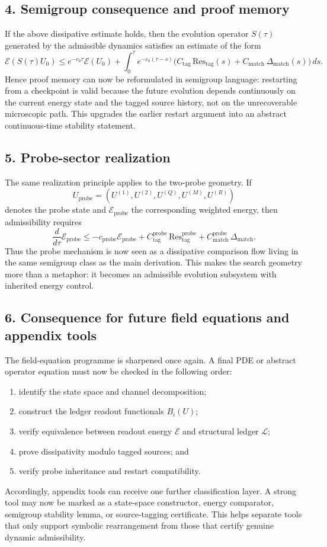 \documentclass[12pt,a4paper]{article}
\begin{document}
\subsection*{4. Semigroup consequence and proof memory}
If the above dissipative estimate holds, then the evolution operator $S(\tau)$
generated by the admissible dynamics satisfies an estimate of the form
\[
\mathcal E(S(\tau)U_0)
\le e^{-c_0\tau}\mathcal E(U_0)
+\int_0^\tau e^{-c_0(\tau-s)}
\bigl(C_{\mathrm{tag}}\,\mathrm{Res}_{\mathrm{tag}}(s)
+ C_{\mathrm{match}}\,\Delta_{\mathrm{match}}(s)\bigr)\,ds.
\]
Hence proof memory can now be reformulated in semigroup language: restarting from a
checkpoint is valid because the future evolution depends continuously on the current
energy state and the tagged source history, not on the unrecoverable microscopic path.
This upgrades the earlier restart argument into an abstract continuous-time stability
statement.

\subsection*{5. Probe-sector realization}
The same realization principle applies to the two-probe geometry. If
\[
U_{\mathrm{probe}}=(U^{(1)},U^{(2)},U^{(Q)},U^{(M)},U^{(R)})
\]
denotes the probe state and $\mathcal E_{\mathrm{probe}}$ the corresponding weighted
energy, then admissibility requires
\[
\frac{d}{d\tau}\mathcal E_{\mathrm{probe}}
\le -c_{\mathrm{probe}}\mathcal E_{\mathrm{probe}}
+ C^{\mathrm{probe}}_{\mathrm{tag}}\,\mathrm{Res}^{\mathrm{probe}}_{\mathrm{tag}}
+ C^{\mathrm{probe}}_{\mathrm{match}}\,\Delta_{\mathrm{match}}.
\]
Thus the probe mechanism is now seen as a dissipative comparison flow living in the
same semigroup class as the main derivation. This makes the search geometry more than
a metaphor: it becomes an admissible evolution subsystem with inherited energy
control.

\subsection*{6. Consequence for future field equations and appendix tools}
The field-equation programme is sharpened once again. A final PDE or abstract
operator equation must now be checked in the following order:
\begin{enumerate}[label=(\arabic*)]
 \item identify the state space and channel decomposition;
 \item construct the ledger readout functionals $B_i(U)$;
 \item verify equivalence between readout energy $\mathcal E$ and structural ledger $\mathcal L$;
 \item prove dissipativity modulo tagged sources; and
 \item verify probe inheritance and restart compatibility.
\end{enumerate}
Accordingly, appendix tools can receive one further classification layer. A strong
tool may now be marked as a state-space constructor, energy comparator, semigroup
stability lemma, or source-tagging certificate. This helps separate tools that only
support symbolic rearrangement from those that certify genuine dynamic admissibility.
\end{document}
